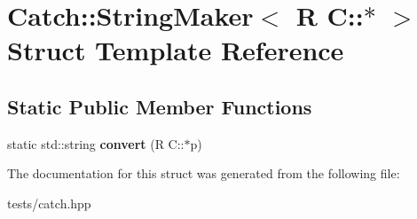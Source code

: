 \hypertarget{struct_catch_1_1_string_maker_3_01_r_01_c_1_1_5_01_4}{}\section{Catch\+:\+:String\+Maker$<$ R C\+:\+:$\ast$ $>$ Struct Template Reference}
\label{struct_catch_1_1_string_maker_3_01_r_01_c_1_1_5_01_4}
\subsection*{Static Public Member Functions}
\begin{DoxyCompactItemize}
\item 
\mbox{\label{struct_catch_1_1_string_maker_3_01_r_01_c_1_1_5_01_4_af69c15e0b406e945777137fe4a333731}} 
static std\+::string {\bfseries convert} (R C\+::$\ast$p)
\end{DoxyCompactItemize}


The documentation for this struct was generated from the following file\+:\begin{DoxyCompactItemize}
\item 
tests/catch.\+hpp\end{DoxyCompactItemize}
